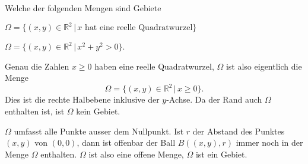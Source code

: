 Welche der folgenden Mengen sind Gebiete
\begin{teilaufgaben}
\item $\Omega=\{(x,y)\in\mathbb R^2\,|\, \text{$x$ hat eine reelle Quadratwurzel}\}$
\item $\Omega=\{(x,y)\in\mathbb R^2\,|\, x^2+y^2>0\}$.
\end{teilaufgaben}


\begin{loesung}
\begin{teilaufgaben}
\item
Genau die Zahlen $x\ge 0$ haben eine reelle Quadratwurzel, $\Omega$ ist
also eigentlich die Menge
\[
\Omega=\{(x,y)\in\mathbb R^2\,|\, x\ge 0\}.
\]
Dies ist die rechte Halbebene inklusive der $y$-Achse. Da der Rand
auch $\Omega$ enthalten ist, ist $\Omega$ kein Gebiet.
\item
$\Omega$ umfasst alle Punkte ausser dem Nullpunkt. Ist $r$ der Abstand
des Punktes $(x,y)$ von $(0,0)$, dann ist offenbar der Ball $B((x,y),r)$
immer noch in der Menge $\Omega$ enthalten. $\Omega$ ist also eine offene
Menge, $\Omega$ ist ein Gebiet.
\end{teilaufgaben}
\end{loesung}
